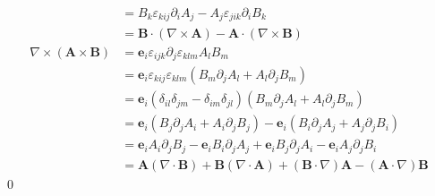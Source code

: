\documentclass[uplatex,dvipdfmx,a4paper,11pt]{jlreq}
\makeatletter
\newcommand{\ee}{\bm{e}}
\renewcommand{\div}{\nabla\cdot}
\newcommand{\rot}{\nabla\times}
\theoremstyle{definition}
\renewenvironment{proof}[1][\proofname]{\par
  \normalfont
  \topsep6\p@\@plus6\p@ \trivlist
  \item[\hskip\labelsep{\bfseries #1}\@addpunct{\bfseries}]\ignorespaces\quad\par
}{%
  \qed\endtrivlist\@endpefalse
}
\renewcommand\proofname{証明}
\makeatother
\begin{document}
\begin{proof}
\begin{align}
                               & = B_k\varepsilon_{kij}\partial_iA_j - A_j\varepsilon_{jik}\partial_iB_k                                                                                             \\
                               & = \bm{B}\cdot(\rot{\bm{A}}) - \bm{A}\cdot(\rot{\bm{B}})                                                                                                             \\
    \rot{(\bm{A}\times\bm{B})} & = \ee_i\varepsilon_{ijk}\partial_j\varepsilon_{klm}A_lB_m                                                                                                           \\
                               & = \ee_i\varepsilon_{kij}\varepsilon_{klm}(B_m\partial_jA_l + A_l\partial_jB_m)                                                                                      \\
                               & = \ee_i(\delta_{il}\delta_{jm} - \delta_{im}\delta_{jl})(B_m\partial_jA_l + A_l\partial_jB_m)                                                                       \\
                               & = \ee_i(B_j\partial_jA_i + A_i\partial_jB_j) - \ee_i(B_i\partial_jA_j + A_j\partial_jB_i)                                                                           \\
                               & = \ee_iA_i\partial_jB_j - \ee_iB_i\partial_jA_j + \ee_iB_j\partial_jA_i - \ee_iA_j\partial_jB_i                                                                     \\
                               & = \bm{A}(\div{\bm{B}}) + \bm{B}(\div{\bm{A}}) + (\bm{B}\cdot\nabla)\bm{A} - (\bm{A}\cdot\nabla)\bm{B}
  \end{align}
\end{proof}
\end{document}
